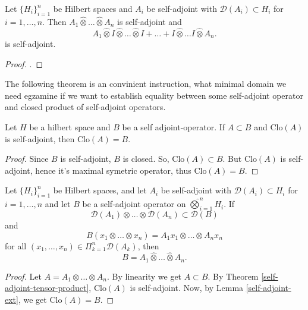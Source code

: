\documentclass[main.tex]{subfiles}
\begin{document}
\begin{theorem}
\label{self-adjoint-tensor-product}
Let $\{H_i\}_{i=1}^n$ be Hilbert spaces and $A_i$ be self-adjoint with $\mathcal{D}(A_i)\subset H_i$ for $i=1,\dots,n$. Then $A_1 \hat{\otimes} \dots \hat{\otimes} A_n$ is self-adjoint and
\begin{equation}
A_1 \hat{\otimes} I \hat{\otimes} \dots \hat{\otimes} I + \dots
+ I \hat{\otimes}\dots I \hat{\otimes} A_n.
\end{equation}
is self-adjoint.
\end{theorem}
\begin{proof}
\cite[see][8.5 Analytic vectors and tensor products of
self-adjoint operators]{weidmann1980}.
\end{proof}
The following theorem is an convinient instruction, what minimal domain we need egzamine if we want to establish equality between some self-adjoint operator and closed product of self-adjoint operators.
\begin{lemma}
\label{self-adjoint-ext}
Let $H$ be a hilbert space and $B$ be a self adjoint-operator. If $A \subset B$ and $\text{Clo}(A)$ is self-adjoint, then $\text{Clo}(A) = B$.
\end{lemma}
\begin{proof}
Since $B$ is self-adjoint, $B$ is closed. So, $\text{Clo}(A)\subset B$. But $\text{Clo}(A)$ is self-adjoint, hence it's maximal symetric operator, thus $\text{Clo}(A)=B$.
\end{proof}
\begin{theorem}
Let $\{H_i\}_{i=1}^n$ be Hilbert spaces, and let $A_i$ be self-adjoint with $\mathcal{D}(A_i)\subset H_i$ for $i=1,\dots,n$ and let $B$ be a self-adjoint operator on $\hat{\bigotimes}_{i=1}^n H_i$.
If
\begin{equation}
\mathcal{D}(A_1) \otimes \dots \otimes \mathcal{D}(A_n) \subset \mathcal{D}(B)
\end{equation}
and 
\begin{equation}
B(x_1 \otimes \dots \otimes x_n) = A_1 x_1 \otimes \dots \otimes A_n x_n
\end{equation}
for all $(x_1, \dots, x_n)\in\Pi_{k=1}^n \mathcal{D}(A_k)$, then
\begin{equation}
B = A_1 \hat{\otimes} \dots \hat{\otimes} A_n.
\end{equation}
\end{theorem}
\begin{proof}
Let $A = A_1 \otimes \dots \otimes A_n$. By linearity we get $A\subset B$. By Theorem \ref{self-adjoint-tensor-product}, $\text{Clo}(A)$ is self-adjoint. Now, by Lemma \ref{self-adjoint-ext}, we get $\text{Clo}(A) = B$.
\end{proof}
\end{document}
